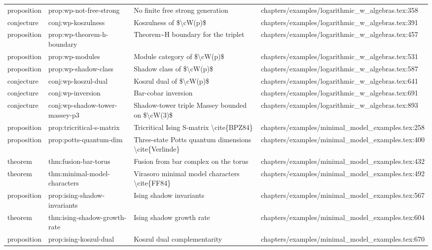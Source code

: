 \documentclass[11pt]{article}
\begin{document}
\begin{longtable}{L{0.10\textwidth}L{0.26\textwidth}L{0.42\textwidth}L{0.22\textwidth}}
proposition & prop:wp-not-free-strong & No finite free strong generation & chapters/examples/logarithmic\_w\_algebras.tex:358\\
conjecture & conj:wp-koszulness & Koszulness of \$\textbackslash{}cW(p)\$ & chapters/examples/logarithmic\_w\_algebras.tex:391\\
proposition & prop:wp-theorem-h-boundary & Theorem\textasciitilde{}H boundary for the triplet & chapters/examples/logarithmic\_w\_algebras.tex:457\\
proposition & prop:wp-modules & Module category of \$\textbackslash{}cW(p)\$ & chapters/examples/logarithmic\_w\_algebras.tex:531\\
proposition & prop:wp-shadow-class & Shadow class of \$\textbackslash{}cW(p)\$ & chapters/examples/logarithmic\_w\_algebras.tex:587\\
conjecture & conj:wp-koszul-dual & Koszul dual of \$\textbackslash{}cW(p)\$ & chapters/examples/logarithmic\_w\_algebras.tex:641\\
conjecture & conj:wp-inversion & Bar-cobar inversion & chapters/examples/logarithmic\_w\_algebras.tex:691\\
conjecture & conj:wp-shadow-tower-massey-p3 & Shadow-tower triple Massey bounded on \$\textbackslash{}cW(3)\$ & chapters/examples/logarithmic\_w\_algebras.tex:893\\
proposition & prop:tricritical-s-matrix & Tricritical Ising S-matrix \textbackslash{}cite\{BPZ84\} & chapters/examples/minimal\_model\_examples.tex:258\\
proposition & prop:potts-quantum-dim & Three-state Potts quantum dimensions \textbackslash{}cite\{Verlinde\} & chapters/examples/minimal\_model\_examples.tex:400\\
theorem & thm:fusion-bar-torus & Fusion from bar complex on the torus & chapters/examples/minimal\_model\_examples.tex:432\\
theorem & thm:minimal-model-characters & Virasoro minimal model characters \textbackslash{}cite\{FF84\} & chapters/examples/minimal\_model\_examples.tex:492\\
proposition & prop:ising-shadow-invariants & Ising shadow invariants & chapters/examples/minimal\_model\_examples.tex:567\\
theorem & thm:ising-shadow-growth-rate & Ising shadow growth rate & chapters/examples/minimal\_model\_examples.tex:604\\
proposition & prop:ising-koszul-dual & Koszul dual complementarity & chapters/examples/minimal\_model\_examples.tex:670\\

\end{longtable}
\end{document}
